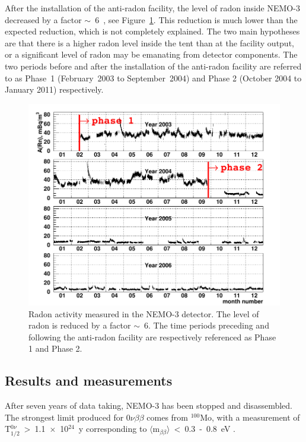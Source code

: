 \documentclass[main.tex]{subfiles}
\begin{document}
\NI After the installation of the anti-radon facility, the level of radon inside NEMO-3 decreased by a factor $\sim$~6~\cite{NEMO3-BKG}, see Figure~\ref{RadonByTime}. This reduction is much lower than the expected reduction, which is not completely explained. The two main hypotheses are that there is a higher radon level inside the tent than at the facility output, or a significant level of radon may be emanating from detector components. The two periods before and after the installation of the anti-radon facility are referred to as Phase~1 (February~2003 to September~2004) and Phase 2 (October 2004 to January 2011) respectively.

 
\begin{figure}[h!]
\begin{center}
\includegraphics[scale=0.65]{pictures/Chap3/rn_bytime.pdf}
\caption{Radon activity measured in the NEMO-3 detector. The level of radon is reduced by a factor $\sim$~6. The time periods preceding and following the anti-radon facility are respectively referenced as Phase 1 and Phase 2.}
\label{RadonByTime}
\end{center}
\end{figure}


\FloatBarrier



\subsection{Results and measurements}


\NI After seven years of data taking, NEMO-3 has been stopped and disassembled. The strongest limit produced for 0$\nu\beta\beta$ comes from $^{\text{100}}$Mo, with a measurement of T$_{\text{1/2}}^{\text{0}\nu}$~>~1.1~$\times$~10$^{\text{24}}$~y corresponding to $\langle$m$_{\beta\beta}\rangle$~<~0.3~-~0.8~eV \cite{NEMO3:Mo100}.
\end{document}
